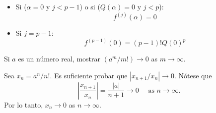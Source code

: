 \begin{cajita}
\begin{dem}
        \begin{itemize}
            \item Si ($\alpha=0$ y $j<p-1$) o si ($Q(\alpha)=0$ y $j<p$):
            $$f^{(j)}(\alpha)=0$$
            \item Si $j=p-1$: 
                $$f^{(p-1)}(0)=(p-1) ! Q(0)^p$$
        \end{itemize}

            \end{dem}
\end{cajita}

\begin{cajita}
    \begin{lema}
        Si $a$  es un número real, mostrar $\left(a^m / m !\right) \rightarrow 0$ as $m \rightarrow \infty$.
        \begin{dem}
            Sea $x_n=a^n / n!$. Es suficiente probar que  $\left|x_{n+1} / x_n\right| \rightarrow 0$. Nótese que
$$
\left|\frac{x_{n+1}}{x_n}\right|=\frac{|a|}{n+1} \rightarrow 0 \quad \text { as } n \rightarrow \infty .
$$
Por lo tanto, $x_n \rightarrow 0$ as $n \rightarrow \infty$.
        \end{dem}

    \end{lema}
\end{cajita}

